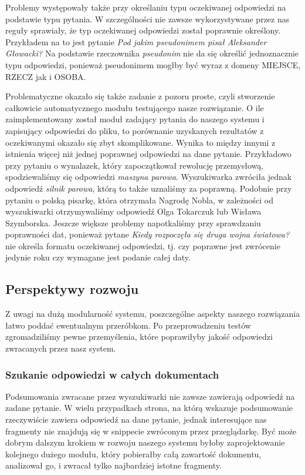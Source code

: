 Problemy występowały także przy określaniu typu oczekiwanej odpowiedzi na podstawie typu pytania. W szczególności nie zawsze wykorzystywane przez nas reguły sprawiały, że typ oczekiwanej odpowiedzi został poprawnie określony. Przykładem na to jest pytanie \emph{Pod jakim pseudonimem pisał Aleksander Głowacki?} Na podstawie rzeczownika \emph{pseudonim} nie da się określić jednoznacznie typu odpowiedzi, ponieważ pseudonimem mogłby być wyraz z domeny MIEJSCE, RZECZ jak i OSOBA.

Problematyczne okazało się także zadanie z pozoru proste, czyli stworzenie całkowicie automatycznego modułu testującego nasze rozwiązanie. O ile zaimplementowany został moduł zadający pytania do naszego systemu i zapisujący odpowiedzi do pliku, to porównanie uzyskanych rezultatów z oczekiwanymi okazało się zbyt skomplikowane. Wynika to między innymi z istnienia więcej niż jednej poprawnej odpowiedzi na dane pytanie. Przykładowo przy pytaniu o wynalazek, który zapoczątkował rewolucję przemysłową, spodziewaliśmy się odpowiedzi \emph{maszyna parowa}. Wyszukiwarka zwróciła jednak odpowiedź \emph{silnik parowa}, którą to także uznaliśmy za poprawną. Podobnie przy pytaniu o polską pisarkę, która otrzymała Nagrodę Nobla, w zależności od wyszukiwarki otrzymywaliśmy odpowiedź Olga Tokarczuk lub Wisława Szymborska. Jeszcze większe problemy napotkaliśmy przy sprawdzaniu poprawności dat, ponieważ pytane \emph{Kiedy rozpoczęła się druga wojna światowa?} nie określa formatu oczekiwanej odpowiedzi, tj. czy poprawne jest zwrócenie jedynie roku czy wymagane jest podanie całej daty. 

\subsection{Perspektywy rozwoju}
Z uwagi na dużą modularność systemu, poszczególne aspekty naszego rozwiązania łatwo poddać ewentualnym przeróbkom. Po przeprowadzeniu testów zgromadziliśmy pewne przemyślenia, które poprawiłyby jakość odpowiedzi zwracanych przez nasz system. 

\subsubsection{Szukanie odpowiedzi w całych dokumentach}
Podsumowania zwracane przez wyszukiwarki nie zawsze zawierają odpowiedź na zadane pytanie. W wielu przypadkach strona, na którą wskazuje podsumowanie rzeczywiście zawiera odpowiedź na dane pytanie, jednak interesujące nas fragmenty nie znajdują się w snippecie zwróconym przez przeglądarkę. Być może dobrym dalszym krokiem w rozwoju naszego systemu byłoby zaprojektowanie kolejnego dużego modułu, który pobierałby całą zawartość dokumentu, analizował go, i zwracał tylko najbardziej istotne fragmenty.

